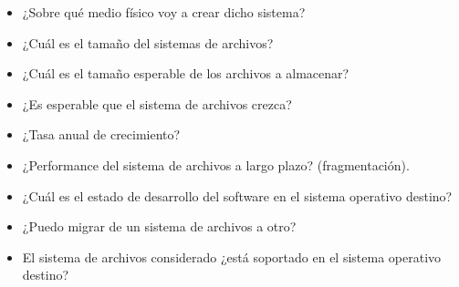 \begin{itemize}
\item ¿Sobre qué medio físico voy a crear dicho sistema?
\item ¿Cuál es el tamaño del sistemas de archivos?
\item ¿Cuál es el tamaño esperable de los archivos a almacenar?
\item ¿Es esperable que el sistema de archivos crezca?
\item ¿Tasa anual de crecimiento?
\item ¿Performance del sistema de archivos a largo plazo? (fragmentación).
\item ¿Cuál es el estado de desarrollo del software en el sistema
operativo destino?
\item ¿Puedo migrar de un sistema de archivos a otro?
\item El sistema de archivos considerado ¿está soportado en el sistema
operativo destino?
\end{itemize}






